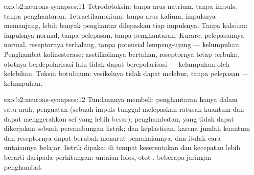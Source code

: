 \begin{solution}{exo:b2:neurons-synapses:11}
Tetrodotoksin: tanpa arus natrium, tanpa impuls, tanpa penghantaran.
Tetraetilamonium: tanpa arus kalium, impulsnya memanjang, lebih banyak
penghantar dilepaskan tiap impulsnya. Tanpa kalsium: impulsnya normal,
tanpa pelepasan, tanpa penghantaran. Kurare: pelepasannya normal,
reseptornya terhalang, tanpa potensial lempeng-ujung --- kelumpuhan.
Penghambat kolinesterase: asetilkolinnya bertahan, reseptornya tetap
terbuka, ototnya berdepolarisasi lalu tidak dapat berepolarisasi ---
kelumpuhan oleh kelebihan. Toksin botulinum: vesikelnya tidak dapat
melebur, tanpa pelepasan --- kelumpuhan.
\end{solution}

\begin{solution}{exo:b2:neurons-synapses:12}
Tundaannya membeli: penghantaran hanya dalam satu arah; penguatan
(sebuah impuls tunggal melepaskan ratusan kuantum dan dapat
menggerakkan sel yang lebih besar); penghambatan, yang tidak dapat
dikerjakan sebuah persambungan listrik; dan keplastisan, karena jumlah
kuantum dan reseptornya dapat berubah menurut pemakaiannya, dan itulah
cara untaiannya belajar.  listrik dipakai di tempat
keserentakan dan kecepatan lebih berarti daripada perhitungan: untaian
lolos, otot , beberapa jaringan penghambat.
\end{solution}

